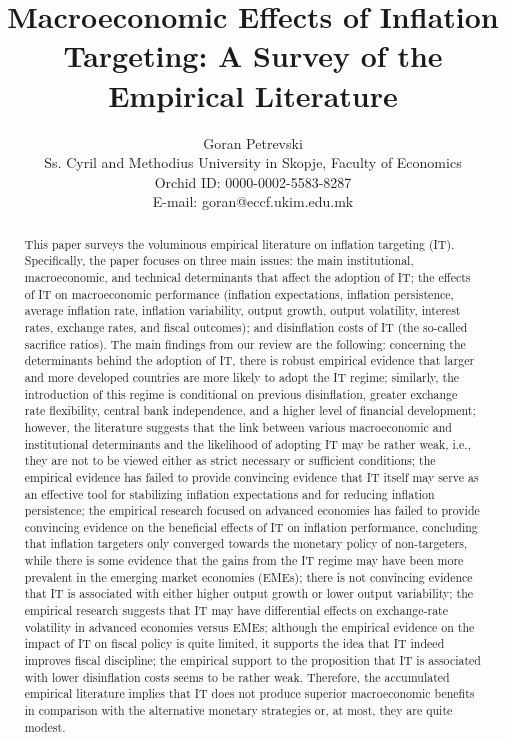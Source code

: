 \documentclass{article}
\title{Macroeconomic Effects of Inflation Targeting: A Survey of the Empirical Literature}
\author{Goran Petrevski \\
        Ss. Cyril and Methodius University in Skopje, Faculty of Economics \\
        Orchid ID: 0000-0002-5583-8287 \\
        E-mail: goran@eccf.ukim.edu.mk}
\begin{document}
\maketitle

\begin{abstract}
This paper surveys the voluminous empirical literature on inflation targeting (IT). Specifically, the paper focuses on three main issues: the main institutional, macroeconomic, and technical determinants that affect the adoption of IT; the effects of IT on macroeconomic performance (inflation expectations, inflation persistence, average inflation rate, inflation variability, output growth, output volatility, interest rates, exchange rates, and fiscal outcomes); and disinflation costs of IT (the so-called sacrifice ratios). The main findings from our review are the following: concerning the determinants behind the adoption of IT, there is robust empirical evidence that larger and more developed countries are more likely to adopt the IT regime; similarly, the introduction of this regime is conditional on previous disinflation, greater exchange rate flexibility, central bank independence, and a higher level of financial development; however, the literature suggests that the link between various macroeconomic and institutional determinants and the likelihood of adopting IT may be rather weak, i.e., they are not to be viewed either as strict necessary or sufficient conditions; the empirical evidence has failed to provide convincing evidence that IT itself may serve as an effective tool for stabilizing inflation expectations and for reducing inflation persistence; the empirical research focused on advanced economies has failed to provide convincing evidence on the beneficial effects of IT on inflation performance, concluding that inflation targeters only converged towards the monetary policy of non-targeters, while there is some evidence that the gains from the IT regime may have been more prevalent in the emerging market economies (EMEs); there is not convincing evidence that IT is associated with either higher output growth or lower output variability; the empirical research suggests that IT may have differential effects on exchange-rate volatility in advanced economies versus EMEs; although the empirical evidence on the impact of IT on fiscal policy is quite limited, it supports the idea that IT indeed improves fiscal discipline; the empirical support to the proposition that IT is associated with lower disinflation costs seems to be rather weak. Therefore, the accumulated empirical literature implies that IT does not produce superior macroeconomic benefits in comparison with the alternative monetary strategies or, at most, they are quite modest.
\end{abstract}
\end{document}
